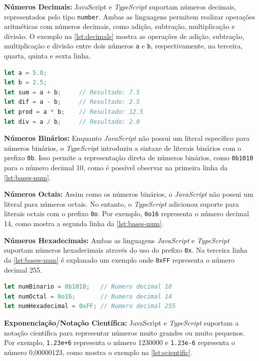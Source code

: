 \textbf{Números Decimais:} JavaScript e \textit{TypeScript} suportam números decimais, representados pelo tipo \texttt{number}. Ambas as linguagens permitem realizar operações aritméticas com números decimais, como adição, subtração, multiplicação e divisão. O exemplo na \autoref{lst:decimals} mostra as operações de adição, subtração, multiplicação e divisão entre dois números \texttt{a} e \texttt{b}, respectivamente, na terceira, quarta, quinta e sexta linha.

\Needspace{0.3\textheight}
\begin{lstlisting}[language=TypeScript, caption={Operações com números decimais em \textit{JavaScript} e \textit{TypeScript}}, label={lst:decimals}]
let a = 5.0;
let b = 2.5;
let sum = a + b;     // Resultado: 7.5
let dif = a - b;     // Resultado: 2.5
let prod = a * b;    // Resultado: 12.5
let div = a / b;     // Resultado: 2.0
\end{lstlisting}

\textbf{Números Binários:} Enquanto \textit{JavaScript} não possui um literal específico para números binários, o \textit{TypeScript} introduziu a sintaxe de literais binários com o prefixo \texttt{0b}. Isso permite a representação direta de números binários, como \texttt{0b1010} para o número decimal 10, como é possível observar na primeira linha da \autoref{lst:bases-num}.

\textbf{Números Octais:} Assim como os números binários, o \textit{JavaScript} não possui um literal para números octais. No entanto, o \textit{TypeScript} adicionou suporte para literais octais com o prefixo \texttt{0o}. Por exemplo, \texttt{0o16} representa o número decimal 14, como mostra a segunda linha da \autoref{lst:bases-num}.

\textbf{Números Hexadecimais:} Ambas as linguagens \textit{JavaScript} e \textit{TypeScript} suportam números hexadecimais através do uso do prefixo \texttt{0x}. Na terceira linha da \autoref{lst:bases-num} é explanado um exemplo onde \texttt{0xFF} representa o número decimal 255.

\begin{lstlisting}[language=TypeScript, caption={Números binários em \textit{TypeScript}}, label={lst:bases-num}]
let numBinario = 0b1010;   // Numero decimal 10
let numOctal = 0o16;       // Numero decimal 14
let numHexadecimal = 0xFF; // Numero decimal 255
\end{lstlisting}

\textbf{Exponenciação/Notação Científica:} JavaScript e \textit{TypeScript} suportam a notação científica para representar números muito grandes ou muito pequenos. Por exemplo, \texttt{1.23e+6} representa o número 1230000 e \texttt{1.23e-6} representa o número 0,00000123, como mostra o exemplo na \autoref{lst:scientific}.


